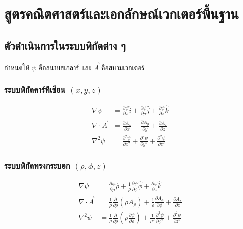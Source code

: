 \chapter{สูตรคณิตศาสตร์และเอกลักษณ์เวกเตอร์พื้นฐาน}

\section{ตัวดำเนินการในระบบพิกัดต่าง ๆ}
กำหนดให้ $\psi$ คือสนามสเกลาร์ และ $\vec{A}$ คือสนามเวกเตอร์

\subsection{\texorpdfstring{ระบบพิกัดคาร์ทีเซียน $(x, y, z)$}{ระบบพิกัดคาร์ทีเซียน (x, y, z)}}
\begin{align}
\nabla \psi &= \frac{\partial \psi}{\partial x}\hat{i} + \frac{\partial \psi}{\partial y}\hat{j} + \frac{\partial \psi}{\partial z}\hat{k} \\
\nabla \cdot \vec{A} &= \frac{\partial A_x}{\partial x} + \frac{\partial A_y}{\partial y} + \frac{\partial A_z}{\partial z} \\
\nabla^2 \psi &= \frac{\partial^2 \psi}{\partial x^2} + \frac{\partial^2 \psi}{\partial y^2} + \frac{\partial^2 \psi}{\partial z^2}
\end{align}

\subsection{\texorpdfstring{ระบบพิกัดทรงกระบอก $(\rho, \phi, z)$}{ระบบพิกัดทรงกระบอก (rho, phi, z)}}
\begin{align}
\nabla \psi &= \frac{\partial \psi}{\partial \rho}\hat{\rho} + \frac{1}{\rho}\frac{\partial \psi}{\partial \phi}\hat{\phi} + \frac{\partial \psi}{\partial z}\hat{k} \\
\nabla \cdot \vec{A} &= \frac{1}{\rho}\frac{\partial}{\partial \rho}(\rho A_\rho) + \frac{1}{\rho}\frac{\partial A_\phi}{\partial \phi} + \frac{\partial A_z}{\partial z} \\
\nabla^2 \psi &= \frac{1}{\rho}\frac{\partial}{\partial \rho}\left(\rho\frac{\partial \psi}{\partial \rho}\right) + \frac{1}{\rho^2}\frac{\partial^2 \psi}{\partial \phi^2} + \frac{\partial^2 \psi}{\partial z^2}
\end{align}

